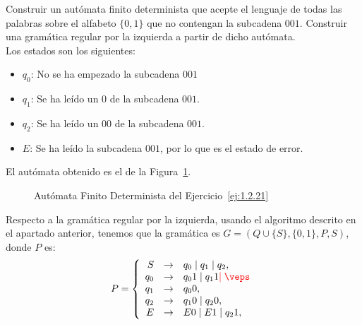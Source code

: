 \begin{ejercicio} \label{ej:1.2.21}
    Construir un autómata finito determinista que acepte el lenguaje de todas las palabras sobre el alfabeto $\{0, 1\}$ que no contengan la subcadena $001$.
    Construir una gramática regular por la izquierda a partir de dicho autómata.\\

    Los estados son los siguientes:
    \begin{itemize}
        \item \ul{$q_0$}: No se ha empezado la subcadena $001$
        \item \ul{$q_1$}: Se ha leído un $0$ de la subcadena $001$.
        \item \ul{$q_2$}: Se ha leído un $00$ de la subcadena $001$.
        \item \ul{$E$}: Se ha leído la subcadena $001$, por lo que es el estado de error.
    \end{itemize}

    El autómata obtenido es el de la Figura~\ref{fig:ej:1.2.21}.
    \begin{figure}
        \centering
        \caption{Autómata Finito Determinista del Ejercicio~\ref{ej:1.2.21}}
        \label{fig:ej:1.2.21}
    \end{figure}
    
    Respecto a la gramática regular por la izquierda, usando el algoritmo descrito en el apartado anterior, tenemos que la gramática es $G=(Q\cup \{S\}, \{0, 1\}, P, S)$, donde $P$ es:
    \begin{align*}
        P=\left\{
            \begin{array}{rcll}
                S &\to& q_0 \mid q_1 \mid q_2,\\
                q_0 &\to& q_0 1 \mid q_1 1 \red{\mid \veps}\\
                q_1 &\to& q_0 0,\\
                q_2 &\to& q_1 0 \mid q_2 0,\\
                E &\to& E0 \mid E1 \mid q_2 1,
            \end{array}
        \right.
    \end{align*}

\end{ejercicio}

